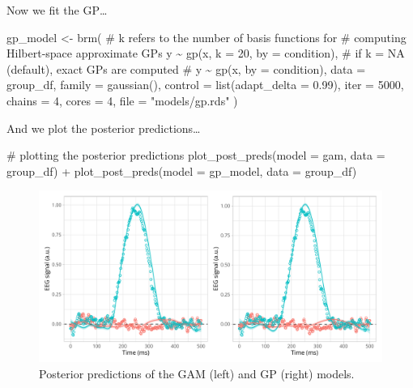 \documentclass[
  doc,
  floatsintext,
  longtable,
  a4paper,
  nolmodern,
  notxfonts,
  notimes,
  colorlinks=true,linkcolor=blue,citecolor=blue,urlcolor=blue]{apa7}
\newenvironment{Shaded}{\begin{snugshade}}{\end{snugshade}}
\newcommand{\AttributeTok}[1]{\textcolor[rgb]{0.40,0.45,0.13}{#1}}
\newcommand{\CommentTok}[1]{\textcolor[rgb]{0.37,0.37,0.37}{#1}}
\newcommand{\DecValTok}[1]{\textcolor[rgb]{0.68,0.00,0.00}{#1}}
\newcommand{\FloatTok}[1]{\textcolor[rgb]{0.68,0.00,0.00}{#1}}
\newcommand{\FunctionTok}[1]{\textcolor[rgb]{0.28,0.35,0.67}{#1}}
\newcommand{\NormalTok}[1]{\textcolor[rgb]{0.00,0.23,0.31}{#1}}
\newcommand{\OtherTok}[1]{\textcolor[rgb]{0.00,0.23,0.31}{#1}}
\newcommand{\SpecialCharTok}[1]{\textcolor[rgb]{0.37,0.37,0.37}{#1}}
\newcommand{\StringTok}[1]{\textcolor[rgb]{0.13,0.47,0.30}{#1}}
\begin{document}
Now we fit the GP\ldots{}

\begin{Shaded}
\begin{Highlighting}[]
\NormalTok{gp\_model }\OtherTok{\textless{}{-}} \FunctionTok{brm}\NormalTok{(}
    \CommentTok{\# k refers to the number of basis functions for}
    \CommentTok{\# computing Hilbert{-}space approximate GPs}
\NormalTok{    y }\SpecialCharTok{\textasciitilde{}} \FunctionTok{gp}\NormalTok{(x, }\AttributeTok{k =} \DecValTok{20}\NormalTok{, }\AttributeTok{by =}\NormalTok{ condition),}
    \CommentTok{\# if k = NA (default), exact GPs are computed}
    \CommentTok{\# y \textasciitilde{} gp(x, by = condition),}
    \AttributeTok{data =}\NormalTok{ group\_df,}
    \AttributeTok{family =} \FunctionTok{gaussian}\NormalTok{(),}
    \AttributeTok{control =} \FunctionTok{list}\NormalTok{(}\AttributeTok{adapt\_delta =} \FloatTok{0.99}\NormalTok{),}
    \AttributeTok{iter =} \DecValTok{5000}\NormalTok{,}
    \AttributeTok{chains =} \DecValTok{4}\NormalTok{,}
    \AttributeTok{cores =} \DecValTok{4}\NormalTok{,}
    \AttributeTok{file =} \StringTok{"models/gp.rds"}
\NormalTok{    )}
\end{Highlighting}
\end{Shaded}

And we plot the posterior predictions\ldots{}

\begin{Shaded}
\begin{Highlighting}[]
\CommentTok{\# plotting the posterior predictions}
\FunctionTok{plot\_post\_preds}\NormalTok{(}\AttributeTok{model =}\NormalTok{ gam, }\AttributeTok{data =}\NormalTok{ group\_df) }\SpecialCharTok{+}
    \FunctionTok{plot\_post\_preds}\NormalTok{(}\AttributeTok{model =}\NormalTok{ gp\_model, }\AttributeTok{data =}\NormalTok{ group\_df)}
\end{Highlighting}
\end{Shaded}

\begin{figure}[H]

\caption{Posterior predictions of the GAM (left) and GP (right) models.}

{\centering \includegraphics[width=1\textwidth,height=\textheight]{brms_meeg_files/figure-pdf/gam-gp-preds-1.pdf}

}

\end{figure}%
\end{document}
